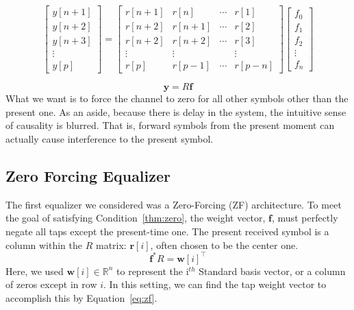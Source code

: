 \documentclass[]{article}
\begin{document}
\begin{equation}
\label{eq:equalizerVector}
\left[ \begin{array}{c}
 y \left[n+1\right] \\
 y \left[n+2\right] \\
 y \left[n+3\right] \\
\vdots  \\
y\left[ p \right] \end{array} \right] = 
\begin{bmatrix} 
r \left[ n+1\right]  & r[n] & \cdots & r\left[ 1 \right] \\ 
r \left[ n+2\right]  & r[n+1] & \cdots & r\left[ 2 \right] \\ 
r \left[ n+2\right]  & r[n+2] & \cdots & r\left[ 3 \right] \\ 
\vdots & \vdots & & \vdots \\
r \left[p \right] & r\left[ p-1 \right] & \cdots & r\left[ p-n \right]
\end{bmatrix}
 \left[ \begin{array}{c} f_0 \\ f_1 \\ f_2 \\ \vdots \\ f_n \end{array} \right]
\end{equation}

\begin{equation}
\label{eq:equalizerMatrix}
\mathbf{y} = R\mathbf{f}
\end{equation}
What we want is to force the channel to zero for all other symbols other than the present one.  As an aside, because there is delay in the system, the intuitive sense of causality is blurred. That is, forward symbols from the present moment can actually cause interference to the present symbol. \\

\subsection{Zero Forcing Equalizer}
\label{sec:zf}
The first equalizer we considered was a Zero-Forcing (ZF) architecture.  To meet the goal of satisfying Condition~\ref{thm:zero}, the weight vector, $\mathbf{f}$, must perfectly negate all taps except the present-time one.  The present received symbol is a column within the $R$ matrix: $\mathbf{r}[i]$, often chosen to be the center one.  
$$ \mathbf{f}^{\ast}R = \mathbf{w}[i]^{\top} $$
Here, we used  $\mathbf{w} [i] \in \mathbb{R}^n$ to represent the i$^{th}$ Standard basis vector, or a column of zeros except in row $i$.  In this setting, we can find the tap weight vector to accomplish this by Equation~\ref{eq:zf}.  \\
\end{document}
